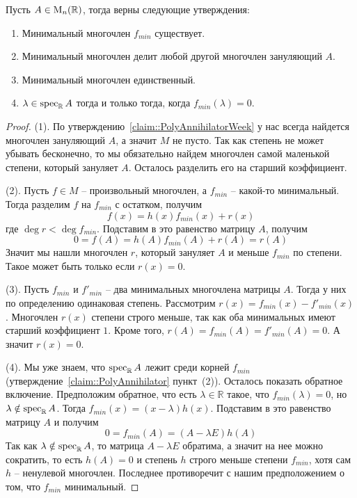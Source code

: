 \begin{claim}
\label{claim::MinPoly}
Пусть $A\in \operatorname{M}_{n}(\mathbb R)$, тогда верны следующие утверждения:
\begin{enumerate}
\item Минимальный многочлен $f_{min}$ существует.

\item Минимальный многочлен делит любой другой многочлен зануляющий $A$.

\item Минимальный многочлен единственный.

\item $\lambda\in\operatorname{spec}_\mathbb R A$ тогда и только тогда, когда $f_{min}(\lambda) = 0$.
\end{enumerate}
\end{claim}
\begin{proof}
(1).
По утверждению~\ref{claim::PolyAnnihilatorWeek} у нас всегда найдется многочлен зануляющий $A$, а значит $M$ не пусто.
Так как степень не может убывать бесконечно, то мы обязательно найдем многочлен самой маленькой степени, который зануляет $A$.
Осталось разделить его на старший коэффициент.

(2).
Пусть $f\in M$ -- произвольный многочлен, а $f_{min}$ -- какой-то минимальный.
Тогда разделим $f$ на $f_{min}$ с остатком, получим 
\[
f(x) = h(x)f_{min}(x) + r(x)
\]
где $\deg r < \deg f_{min}$.
Подставим в это равенство матрицу $A$, получим
\[
0 = f(A) = h(A)f_{min}(A) + r(A) = r(A)
\]
Значит мы нашли многочлен $r$, который зануляет $A$ и меньше $f_{min}$ по степени.
Такое может быть только если $r(x) = 0$.

(3).
Пусть $f_{min}$ и $f'_{min}$ -- два минимальных многочлена матрицы $A$.
Тогда у них по определению одинаковая степень.
Рассмотрим $r(x) = f_{min}(x) - f'_{min}(x)$.
Многочлен $r(x)$ степени строго меньше, так как оба минимальных имеют старший коэффициент $1$.
Кроме того, $r(A) = f_{min }(A) = f'_{min}(A) = 0$.
А значит $r(x) = 0$.

(4).
Мы уже знаем, что $\operatorname{spec}_\mathbb RA$ лежит среди корней $f_{min}$ (утверждение~\ref{claim::PolyAnnihilator} пункт~(2)).
Осталось показать обратное включение.
Предположим обратное, что есть $\lambda\in \mathbb R$ такое, что $f_{min}(\lambda) = 0$, но $\lambda\notin\operatorname{spec}_\mathbb RA$.
Тогда $f_{min}(x) = (x-\lambda)h(x)$.
Подставим в это равенство матрицу $A$ и получим 
\[
0 = f_{min}(A) = (A - \lambda E)h(A)
\]
Так как $\lambda\notin\operatorname{spec}_\mathbb R A$, то матрица $A-\lambda E$ обратима, а значит на нее можно сократить, то есть $h(A) = 0$ и степень $h$ строго меньше степени $f_{min}$, хотя сам $h$ -- ненулевой многочлен.
Последнее противоречит с нашим предположением о том, что $f_{min}$ минимальный.
\end{proof}

